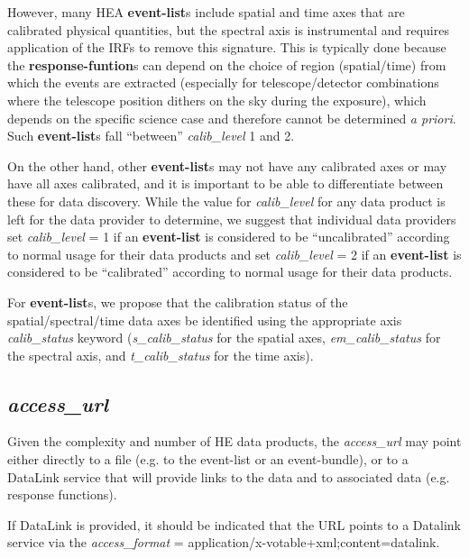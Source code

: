\documentclass[11pt,a4paper]{ivoa}
\begin{document}
However, many HEA {\bf event-list}s include spatial and time axes that are calibrated physical quantities, but the spectral axis is instrumental and requires application of the IRFs to remove this signature.  This is typically done because the {\bf response-funtion}s can depend on the choice of region (spatial/time) from which the events are extracted (especially for telescope/detector combinations where the telescope position dithers on the sky during the exposure), which depends on the specific science case and therefore cannot be determined {\em a priori\/}.  Such {\bf event-list}s fall ``between'' {\em calib\_level\/} 1 and 2.

On the other hand, other {\bf event-list}s may not have any calibrated axes or may have all axes calibrated, and it is important to be able to differentiate between these for data discovery.  While the value for {\em calib\_level\/} for any data product is left for the data provider to determine, we suggest that individual data providers set {\em calib\_level\/} = 1 if an {\bf event-list} is considered to be ``uncalibrated'' according to normal usage for their data products and set {\em calib\_level\/} = 2 if an {\bf event-list} is considered to be ``calibrated'' according to normal usage for their data products.

For {\bf event-list}s, we propose that the calibration status of the spatial/spectral/time data axes be identified using the appropriate axis {\em calib\_status\/} keyword ({\em s\_calib\_status\/} for the spatial axes, {\em em\_calib\_status\/} for the spectral axis, and {\em t\_calib\_status\/} for the time axis).


\subsection{{\em access\_url}}

Given the complexity and number of HE data products, the {\em access\_url} may point either directly to a file (e.g. to the event-list or an event-bundle), or to a DataLink service that will provide links to the data and to associated data (e.g. response functions).

If DataLink is provided, it should be indicated that the URL points to a Datalink service via the {\em access\_format} = application/x-votable+xml;content=datalink.
\end{document}
